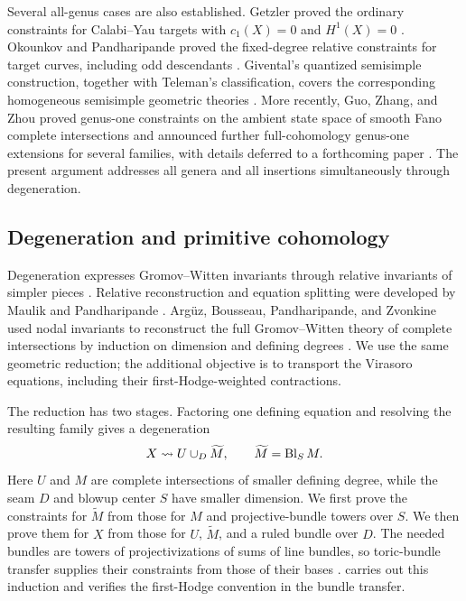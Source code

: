 Several all-genus cases are also established. Getzler proved the ordinary constraints for Calabi--Yau targets with $c_1(X)=0$ and $H^1(X)=0$ \cite[Theorem~7.1]{Getzler1999}. Okounkov and Pandharipande proved the fixed-degree relative constraints for target curves, including odd descendants \cite[Theorem~3]{OP2003}. Givental's quantized semisimple construction, together with Teleman's classification, covers the corresponding homogeneous semisimple geometric theories \cite{Givental2001,Teleman2012}. More recently, Guo, Zhang, and Zhou proved genus-one constraints on the ambient state space of smooth Fano complete intersections and announced further full-cohomology genus-one extensions for several families, with details deferred to a forthcoming paper \cite[Theorem~1 and Remark~3.10]{GuoZhangZhou2026}. The present argument addresses all genera and all insertions simultaneously through degeneration.

\subsection{Degeneration and primitive cohomology}

Degeneration expresses Gromov--Witten invariants through relative invariants of simpler pieces \cite{Li2001,Li2002,AF2016}. Relative reconstruction and equation splitting were developed by Maulik and Pandharipande \cite{MaulikPandharipande2006}. Arg\"uz, Bousseau, Pandharipande, and Zvonkine used nodal invariants to reconstruct the full Gromov--Witten theory of complete intersections by induction on dimension and defining degrees \cite[Theorem~5.3 and Section~5.3]{ABPZ}. We use the same geometric reduction; the additional objective is to transport the Virasoro equations, including their first-Hodge-weighted contractions.

The reduction has two stages. Factoring one defining equation and resolving the resulting family gives a degeneration
\[
 X\rightsquigarrow U\cup_D\widetilde M,
 \qquad \widetilde M=\operatorname{Bl}_S M.
\]
Here $U$ and $M$ are complete intersections of smaller defining degree, while the seam $D$ and blowup center $S$ have smaller dimension. We first prove the constraints for $\widetilde M$ from those for $M$ and projective-bundle towers over $S$. We then prove them for $X$ from those for $U$, $\widetilde M$, and a ruled bundle over $D$. The needed bundles are towers of projectivizations of sums of line bundles, so toric-bundle transfer supplies their constraints from those of their bases \cite{CGT}.  carries out this induction and verifies the first-Hodge convention in the bundle transfer.

